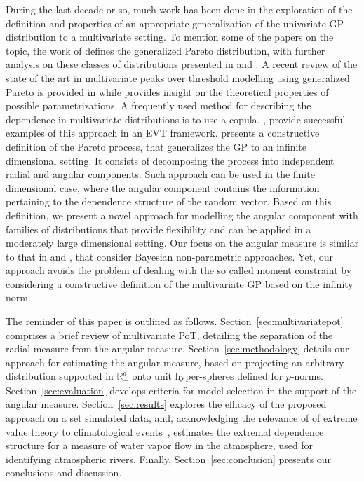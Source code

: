 During the last decade or so, much work has been done in the exploration of the definition and properties of an
  appropriate generalization of the univariate GP distribution 
  to a multivariate setting.  To mention some of the papers on the topic, the work of
  \cite{rootzen2006} defines the generalized Pareto distribution, with further analysis on these classes
  of distributions presented in \cite{falk2008} and \cite{michel2008}.  A recent review of the state
  of the art in multivariate peaks over threshold modelling using generalized Pareto is provided in
  \cite{rootzen2018} while \cite{RoSeWa2018a} provides insight on the theoretical properties of possible parametrizations. 
  A frequently used method for describing the dependence
  in multivariate distributions is to use a copula. \cite{renard2007,falk2019}, provide successful examples of this approach in an EVT framework. \cite{ferreira2014} presents a constructive definition of the Pareto process, that generalizes the GP to an infinite dimensional setting. It consists of decomposing the process into independent radial and angular components. Such approach can be used in the finite dimensional case, where the angular component 
  contains the information pertaining to the dependence structure of the random vector.
  Based on this definition, we present a novel approach for modelling  the angular component
  with families of distributions that provide flexibility and can be applied in a moderately large dimensional setting.
  Our focus on the  angular measure is similar to that in \cite{SaNa2014} and \cite{HaCaCh2017}, that consider Bayesian non-parametric approaches. Yet, our approach avoids the problem of dealing with the so called moment constraint by considering a constructive definition of the multivariate GP based on the infinity norm.
  
  The reminder of this paper is outlined as follows. Section~\ref{sec:multivariatepot} comprises a brief review of multivariate PoT, detailing the separation of the radial measure from the angular measure.
  Section~\ref{sec:methodology} details our approach for estimating the angular measure, based on projecting an arbitrary distribution supported in ${\mathbb R}_+^d$ onto unit hyper-spheres defined for $p$-norms. Section~\ref{sec:evaluation} develops criteria for model selection in the support of the angular measure.  Section~\ref{sec:results} explores the efficacy of the proposed approach on a set simulated data, and, acknowledging the relevance of of extreme value theory to climatological events~\citep{jentsch2007,vousdoukas2018,li2019}, estimates the extremal dependence structure for a measure of water vapor flow in the atmosphere, used for identifying atmospheric rivers.  Finally, Section~\ref{sec:conclusion} presents our conclusions and discussion.

